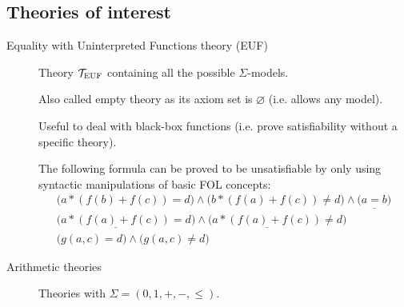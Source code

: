 \subsection{Theories of interest}

\begin{description}
    \item[Equality with Uninterpreted Functions theory (EUF)] 
        Theory $\mathcal{T}_\text{EUF}$ containing all the possible $\Sigma$-models.
        
        \begin{remark}
            Also called empty theory as its axiom set is $\varnothing$ (i.e. allows any model).
        \end{remark}
        
        \begin{remark}
            Useful to deal with black-box functions (i.e. prove satisfiability without a specific theory).
            
            \indenttbox
            \begin{example}
                The following formula can be proved to be unsatisfiable by only using syntactic manipulations of basic FOL concepts:
                \begin{gather*}
                    \big( a * (f(b) + f(c)) = d \big) \land \big( b * (f(a) + f(c)) \neq d \big) \land \underline{\big( a = b \big)} \\
                    \big( \underline{a * (f(a) + f(c))} = d \big) \land \big( \underline{a * (f(a) + f(c))} \neq d \big) \\
                    \big( g(a, c) = d \big) \land \big( g(a, c) \neq d \big)
                \end{gather*}
            \end{example}
        \end{remark}


    \item[Arithmetic theories] 
        Theories with $\Sigma = (0, 1, +, -, \leq)$.


\end{description}
